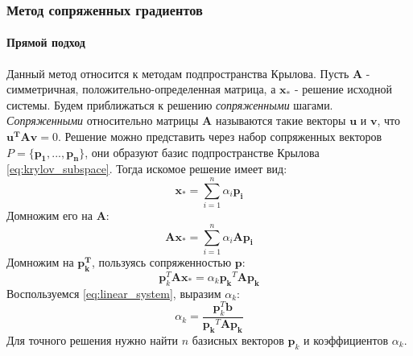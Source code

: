\subsubsection{Метод сопряженных градиентов \label{methods:conjugate_gradients}}
\paragraph{Прямой подход}
Данный метод относится к методам подпространства Крылова.
Пусть $\mathbf{A}$ - симметричная, положительно-определенная матрица, а $\mathbf{x_*}$ - решение исходной системы. Будем приближаться к решению \textit{сопряженными} шагами. \textit{Сопряженными} относительно матрицы $\mathbf{A}$ называются такие векторы $\mathbf{u}$ и $\mathbf{v}$, что  $\mathbf{u^T A v} = 0$. Решение можно представить через набор сопряженных векторов $P = \{ \mathbf{p_1}, ..., \mathbf{p_n} \}$, они образуют базис подпространстве Крылова \eqref{eq:krylov_subspace}. Тогда искомое решение имеет вид:
\begin{equation}
\mathbf{x_*} = \sum^n_{i=1} \alpha_i \mathbf{p_i}
\end{equation}
Домножим его на $\mathbf{A}$:
\begin{equation}
\mathbf{A x_*} = \sum^n_{i=1} \alpha_i \mathbf{A p_i}
\end{equation}
Домножим на $\mathbf{p_k^T}$, пользуясь сопряженностью $\mathbf{p}$:
\begin{equation}
\mathbf{p}^T_k \mathbf{A} \mathbf{x_*} = \alpha_k \mathbf{p_k}^T \mathbf{A} \mathbf{p_k}
\end{equation}
Воспользуемся \eqref{eq:linear_system}, выразим $\alpha_k$:
\begin{equation}
\alpha_k = \frac{\mathbf{p}^T_k \mathbf{b}}{\mathbf{p_k}^T \mathbf{A} \mathbf{p_k}}
\end{equation}
Для точного решения нужно найти $n$ базисных векторов $\mathbf{p}_k$ и коэффициентов $\alpha_k$.

